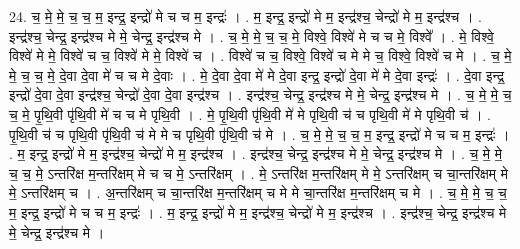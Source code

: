 \documentclass[17pt]{extarticle}
\begin{document}
24. च॒ मे॒ मे॒ च॒ च॒ म॒ इन्द्र॒ इन्द्रो॑ मे च च म॒ इन्द्रः॑ । . म॒ इन्द्र॒ इन्द्रो॑ मे म॒ इन्द्र॑श्च॒ चेन्द्रो॑ मे म॒ इन्द्र॑श्च । . इन्द्र॑श्च॒ चेन्द्र॒ इन्द्र॑श्च मे मे॒ चेन्द्र॒ इन्द्र॑श्च मे । . च॒ मे॒ मे॒ च॒ च॒ मे॒ विश्वे॒ विश्वे॑ मे च च मे॒ विश्वे᳚ । . मे॒ विश्वे॒ विश्वे॑ मे मे॒ विश्वे॑ च च॒ विश्वे॑ मे मे॒ विश्वे॑ च । . विश्वे॑ च च॒ विश्वे॒ विश्वे॑ च मे मे च॒ विश्वे॒ विश्वे॑ च मे । . च॒ मे॒ मे॒ च॒ च॒ मे॒ दे॒वा दे॒वा मे॑ च च मे दे॒वाः । . मे॒ दे॒वा दे॒वा मे॑ मे दे॒वा इन्द्र॒ इन्द्रो॑ दे॒वा मे॑ मे दे॒वा इन्द्रः॑ । . दे॒वा इन्द्र॒ इन्द्रो॑ दे॒वा दे॒वा इन्द्र॑श्च॒ चेन्द्रो॑ दे॒वा दे॒वा इन्द्र॑श्च । . इन्द्र॑श्च॒ चेन्द्र॒ इन्द्र॑श्च मे मे॒ चेन्द्र॒ इन्द्र॑श्च मे । . च॒ मे॒ मे॒ च॒ च॒ मे॒ पृ॒थि॒वी पृ॑थि॒वी मे॑ च च मे पृथि॒वी । . मे॒ पृ॒थि॒वी पृ॑थि॒वी मे॑ मे पृथि॒वी च॑ च पृथि॒वी मे॑ मे पृथि॒वी च॑ । . पृ॒थि॒वी च॑ च पृथि॒वी पृ॑थि॒वी च॑ मे मे च पृथि॒वी पृ॑थि॒वी च॑ मे । . च॒ मे॒ मे॒ च॒ च॒ म॒ इन्द्र॒ इन्द्रो॑ मे च च म॒ इन्द्रः॑ । . म॒ इन्द्र॒ इन्द्रो॑ मे म॒ इन्द्र॑श्च॒ चेन्द्रो॑ मे म॒ इन्द्र॑श्च । . इन्द्र॑श्च॒ चेन्द्र॒ इन्द्र॑श्च मे मे॒ चेन्द्र॒ इन्द्र॑श्च मे । . च॒ मे॒ मे॒ च॒ च॒ मे॒ ऽन्तरि॑क्ष म॒न्तरि॑क्षम् मे च च मे॒ ऽन्तरि॑क्षम् । . मे॒ ऽन्तरि॑क्ष म॒न्तरि॑क्षम् मे मे॒ ऽन्तरि॑क्षम् च चा॒न्तरि॑क्षम् मे मे॒ ऽन्तरि॑क्षम् च । . अ॒न्तरि॑क्षम् च चा॒न्तरि॑क्ष म॒न्तरि॑क्षम् च मे मे चा॒न्तरि॑क्ष म॒न्तरि॑क्षम् च मे । . च॒ मे॒ मे॒ च॒ च॒ म॒ इन्द्र॒ इन्द्रो॑ मे च च म॒ इन्द्रः॑ । . म॒ इन्द्र॒ इन्द्रो॑ मे म॒ इन्द्र॑श्च॒ चेन्द्रो॑ मे म॒ इन्द्र॑श्च । . इन्द्र॑श्च॒ चेन्द्र॒ इन्द्र॑श्च मे मे॒ चेन्द्र॒ इन्द्र॑श्च मे । \newline
\end{document}
